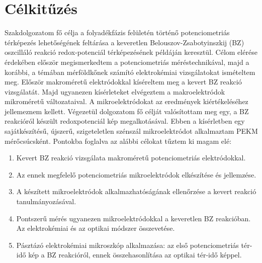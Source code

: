 \chapter{Célkitűzés}
\pagestyle{headings}
   Szakdolgozatom fő célja a folyadékfázis felületén történő potenciometriás térképezés lehetőségének feltárása a keveretlen Belouszov-Zsabotyinszkij (BZ) oszcilláló reakció redox-potenciál térképezésének példáján keresztül. Célom elérése érdekében először megismerkedtem a potenciometriás méréstechnikával, majd a korábbi, a témában mérföldkőnek számító elektrokémiai vizsgálatokat ismételtem meg. Először makroméretű elektródokkal kíséreltem meg a kevert BZ reakció vizsgálatát. Majd ugyanezen kísérleteket elvégeztem a makroelektródok mikroméretű változataival. A mikroelektródokat az eredmények kiértékeléséhez jellemeznem kellett. Végezetül dolgozatom fő célját valósítottam meg egy, a BZ reakcióról készült redoxpotenciál kép megalkotásával. Ebben a kísérletben egy sajátkészítésű, újszerű, szigeteletlen szénszál mikroelektródot alkalmaztam PEKM mérőcsúcsként. Pontokba foglalva az alábbi célokat tűztem ki magam elé:

\begin{enumerate}
\item Kevert BZ reakció vizsgálata makroméretű potenciometriás elektródokkal.
\item Az ennek megfelelő potenciometriás mikroelektródok elkészítése és jellemzése.
\item A készített mikroelektródok alkalmazhatóságának ellenőrzése a kevert reakció tanulmányozásával.
\item Pontszerű mérés ugyanezen mikroelektródokkal a keveretlen BZ reakcióban. Az elektrokémiai és az optikai módszer összevetése.
\item Pásztázó elektrokémiai mikroszkóp alkalmazása: az első potenciometriás tér-idő kép a BZ reakcióról, ennek összehasonlítása az optikai tér-idő képpel.
\end{enumerate}


